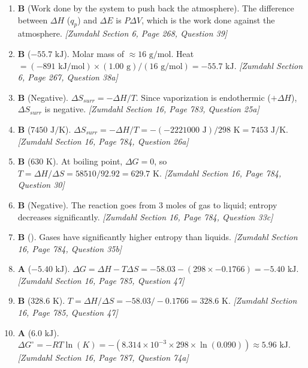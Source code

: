 \documentclass[12pt,letterpaper]{article}
\begin{document}
\begin{enumerate}
    \item \textbf{B} (Work done by the system to push back the atmosphere). The difference between $\Delta H$ ($q_p$) and $\Delta E$ is $P\Delta V$, which is the work done against the atmosphere. \textit{[Zumdahl Section 6, Page 268, Question 39]}
    
    \item \textbf{B} ($-55.7\text{ kJ}$). Molar mass of  $\approx 16\text{ g/mol}$. Heat $= (-891\text{ kJ/mol}) \times (1.00\text{ g}) / (16\text{ g/mol}) = -55.7\text{ kJ}$. \textit{[Zumdahl Section 6, Page 267, Question 38a]}
    
    \item \textbf{B} (Negative). $\Delta S_{surr} = -\Delta H / T$. Since vaporization is endothermic ($+\Delta H$), $\Delta S_{surr}$ is negative. \textit{[Zumdahl Section 16, Page 783, Question 25a]}
    
    \item \textbf{B} ($7450\text{ J/K}$). $\Delta S_{surr} = -\Delta H / T = -(-2221000\text{ J}) / 298\text{ K} = 7453\text{ J/K}$. \textit{[Zumdahl Section 16, Page 784, Question 26a]}
    
    \item \textbf{B} ($630\text{ K}$). At boiling point, $\Delta G = 0$, so $T = \Delta H / \Delta S = 58510 / 92.92 = 629.7\text{ K}$. \textit{[Zumdahl Section 16, Page 784, Question 30]}
    
    \item \textbf{B} (Negative). The reaction goes from $3$ moles of gas to liquid; entropy decreases significantly. \textit{[Zumdahl Section 16, Page 784, Question 33c]}
    
    \item \textbf{B} (). Gases have significantly higher entropy than liquids. \textit{[Zumdahl Section 16, Page 784, Question 35b]}
    
    \item \textbf{A} ($-5.40\text{ kJ}$). $\Delta G = \Delta H - T\Delta S = -58.03 - (298 \times -0.1766) = -5.40\text{ kJ}$. \textit{[Zumdahl Section 16, Page 785, Question 47]}
    
    \item \textbf{B} ($328.6\text{ K}$). $T = \Delta H / \Delta S = -58.03 / -0.1766 = 328.6\text{ K}$. \textit{[Zumdahl Section 16, Page 785, Question 47]}
    
    \item \textbf{A} ($6.0\text{ kJ}$). $\Delta G^\circ = -RT\ln(K) = -(8.314 \times 10^{-3} \times 298 \times \ln(0.090)) \approx 5.96\text{ kJ}$. \textit{[Zumdahl Section 16, Page 787, Question 74a]}
    

\end{enumerate}
\end{document}
